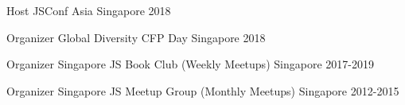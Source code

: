 



\begin{cvhonors}

  \cvhonor
    {Host} %
    {JSConf Asia} %
    {Singapore} %
    {2018} %

  \cvhonor
    {Organizer} %
    {Global Diversity CFP Day} %
    {Singapore} %
    {2018} %

  \cvhonor
    {Organizer} %
    {Singapore JS Book Club (Weekly Meetups)} %
    {Singapore} %
    {2017-2019} %

  \cvhonor
    {Organizer} %
    {Singapore JS Meetup Group (Monthly Meetups)} %
    {Singapore} %
    {2012-2015} %

\end{cvhonors}




